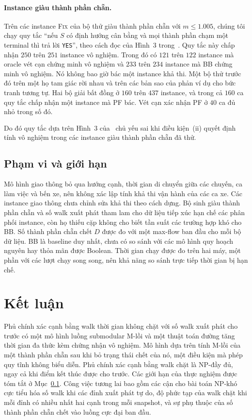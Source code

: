 \documentclass[pdflatex,sn-mathphys-num]{sn-jnl}
\theoremstyle{thmstyleone}%
\theoremstyle{thmstyletwo}%
\theoremstyle{thmstylethree}%
\newcommand{\FIX}{\textup{\textsc{Fix}}}
\newcommand{\YES}{\texttt{YES}}
\begin{document}
\paragraph{Instance giàu thành phần chẵn.} Trên các instance \FIX{} của bộ thử giàu thành phần chẵn với $m\le1.005$, chúng tôi chạy quy tắc ``nếu $S$ có định hướng cân bằng và mọi thành phần chạm một terminal thì trả lời \YES{}'', theo cách đọc của Hình~3 trong~\cite{deligkas2025}. Quy tắc này chấp nhận $250$ trên $251$ instance vô nghiệm. Trong đó có $121$ trên $122$ instance mà oracle vét cạn chứng minh vô nghiệm và $233$ trên $234$ instance mà BB chứng minh vô nghiệm. Nó không bao giờ bác một instance khả thi. Một bộ thử trước đó trên một họ tam giác rời nhau và trên các bản sao của phản ví dụ cho bức tranh tương tự. Hai bộ giải bất đồng ở $160$ trên $437$ instance, và trong cả $160$ ca quy tắc chấp nhận một instance mà PF bác. Vét cạn xác nhận PF ở $40$ ca đủ nhỏ trong số đó.

Do đó quy tắc dựa trên Hình~3 của~\cite{deligkas2025} chủ yếu sai khi điều kiện~(ii) quyết định tính vô nghiệm trong các instance giàu thành phần chẵn đã thử.

\subsection{Phạm vi và giới hạn}\label{sec:scope}

Mô hình giao thông bỏ qua hướng cạnh, thời gian di chuyển giữa các chuyến, ca làm việc và bến xe, nên không xác lập tính khả thi vận hành của các ca xe. Các instance giao thông chưa chỉnh sửa khả thi theo cách dựng. Bộ sinh giàu thành phần chẵn và số walk xuất phát tham lam cho dữ liệu tiếp xúc hạn chế các phân phối instance, còn họ thiếu cặp không cho biết tần suất các trường hợp khó cho BB. Số thành phần chẵn chết $D$ được đo với một max-flow ban đầu cho mỗi bộ dữ liệu. BB là baseline duy nhất, chưa có so sánh với các mô hình quy hoạch nguyên hay thỏa mãn được Boolean. Thời gian chạy được đo trên hai máy, một phần với các lượt chạy song song, nên khả năng so sánh trực tiếp thời gian bị hạn chế.

\section{Kết luận}\label{sec:conclusion}

Phủ chính xác cạnh bằng walk thời gian không chặt với số walk xuất phát cho trước có một mô hình luồng submodular M-lồi và một thuật toán đường tăng thời gian đa thức kèm chứng nhận vô nghiệm. Mô hình dựa trên tính M-lồi của một thành phần chẵn sau khi bỏ trạng thái chết của nó, một điều kiện mà phép quy tĩnh không biểu diễn. Phủ chính xác cạnh bằng walk chặt là NP-đầy đủ, ngay cả khi điểm kết thúc được cho trước. Các giới hạn của thực nghiệm được tóm tắt ở Mục~\ref{sec:scope}. Công việc tương lai bao gồm các cận cho bài toán NP-khó cực tiểu hóa số walk khi các đỉnh xuất phát tự do, độ phức tạp của walk chặt khi mỗi đỉnh có nhiều nhất hai cạnh trong mỗi snapshot, và sự phụ thuộc của số thành phần chẵn chết vào luồng cực đại ban đầu.
\end{document}
